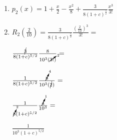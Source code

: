 \documentclass[../practica_05.tex]{subfiles}
\begin{document}
    \begin{enumerate}
        \item $ p_2(x) = 1 + \frac{x}{2} - \frac{x^2}{8} + \frac{3}{8(1+c)^{\frac{5}{2}}}\frac{x^3}{3!} $
        \item $R_2(\frac{2}{10}) = \frac{3}{8(1+c)^{\frac{5}{2}}}\frac{(\frac{2}{10})^3}{3!}=$
        
        $ \frac{\cancel{3}}{8(1+c)^{5/2}}\frac{8}{10^3(\cancelto{2}{3!})} =$

        $ \frac{1}{8(1+c)^{5/2}}\frac{\cancelto{4}{8}}{10^3(\cancel{2})} =$

        $ \frac{1}{\cancelto{2}{8}(1+c)^{5/2}}\frac{\cancelto{1}{4}}{10^3} =$

        $ \frac{1}{10^3(1+c)^{5/2}} $

    \end{enumerate}
\end{document}
